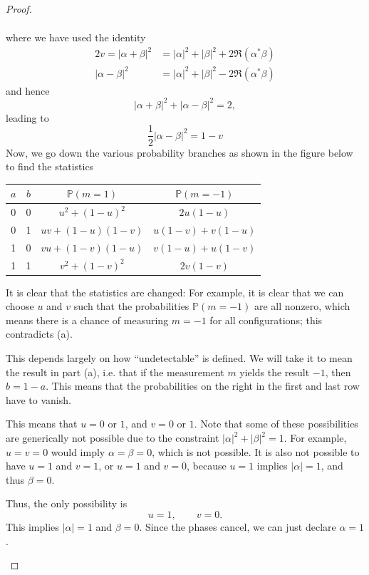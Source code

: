 \begin{proof}
\begin{parts}
\begin{align*}
		\end{align*}
		where we have used the identity
		\begin{align*}
			2v=|\alpha+\beta|^2 &= |\alpha|^2 + |\beta|^2 + 2\Re(\alpha^*\beta)\\
			|\alpha-\beta|^2 &= |\alpha|^2 + |\beta|^2 - 2\Re(\alpha^*\beta)
		\end{align*}
		and hence
		\[|\alpha+\beta|^2 + |\alpha-\beta|^2 = 2,\]
		leading to
		\[\frac 12 |\alpha-\beta|^2 = 1-v\]
		Now, we go down the various probability branches as shown in the figure below to find the statistics
		
\begin{center}
		\begin{tabular}{cccc}
	\toprule
	$a$ & $b$ & $\mathbb{P}(m=1)$ & $\mathbb{P}(m=-1)$ \\\midrule
	0 & 0 & $u^2+(1-u)^2$ & $2u(1-u)$\\\midrule
	0 & 1 & $uv+(1-u)(1-v)$ & $u(1-v)+v(1-u)$\\\midrule
	1 & 0 & $vu+(1-v)(1-u)$ & $v(1-u)+u(1-v)$\\\midrule
	1 & 1 & $v^2 + (1-v)^2$ & $2v(1-v)$\\\bottomrule
\end{tabular}
\end{center}
	
		It is clear that the statistics are changed: For example, it is clear that we can choose $u$ and $v$ such that the probabilities $\mathbb{P}(m=-1)$ are all nonzero, which means there is a chance of measuring $m=-1$ for all configurations; this contradicts (a).
		\item This depends largely on how ``undetectable'' is defined. We will take it to mean the result in part (a), i.e. that if the measurement $m$ yields the result $-1$, then $b=1-a$.  This means that the probabilities on the right in the first and last row have to vanish.
		
		This means that $u=0$ or $1$, and $v=0$ or $1$. Note that some of these possibilities are generically not possible due to the constraint $|\alpha|^2 + |\beta|^2 = 1$. For example, $u=v=0$ would imply $\alpha=\beta=0$, which is not possible. It is also not possible to have $u=1$ and $v=1$, or $u=1$ and $v=0$, because $u=1$ implies $|\alpha|=1$, and thus $\beta=0$. 
		
		Thus, the only possibility is
		\[u=1, \qquad v=0.\]
		This implies $|\alpha|=1$ and $\beta = 0$. Since the phases cancel, we can just declare $\alpha=1$. 
		

\end{parts}
\end{proof}

